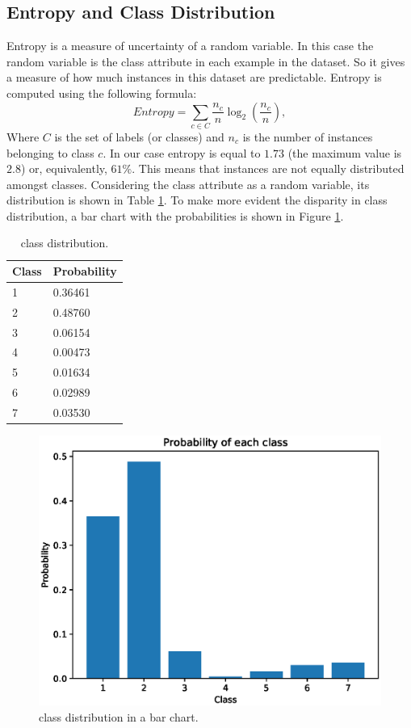 \documentclass[a4paper, 10pt]{article}
\begin{document}
\subsection{Entropy and Class Distribution}
Entropy is a measure of uncertainty of a random variable. In this case the random variable is the class attribute in each example in the dataset. So it gives a measure of how much instances in this dataset are predictable. Entropy is computed using the following formula:
\begin{equation}
	\textit{Entropy} = \sum_{c \in C}\dfrac{n_c}{n}\log_2\left(\dfrac{n_c}{n}\right),
\end{equation}
Where $C$ is the set of labels (or classes) and $n_c$ is the number of instances belonging to class $c$. In our case entropy is equal to $1.73$ (the maximum value is $2.8$) or, equivalently, $61\%$. This means that instances are not equally distributed amongst classes. Considering the class attribute as a random variable, its distribution is shown in Table \ref{tab:class_dist}. To make more evident the disparity in class distribution, a bar chart with the probabilities is shown in Figure \ref{fig:class_dist}.  

\begin{table}[h!]
 \centering
 \begin{tabular}{|l|l|}
 \hline
 \textbf{Class} & \textbf{Probability} \\\hline
 1 & 0.36461\\\hline
2 & 0.48760\\\hline 
3 & 0.06154\\\hline 
4 & 0.00473\\\hline 
5 & 0.01634\\\hline 
6 & 0.02989\\\hline
7 & 0.03530\\\hline
 \end{tabular}
\caption{class distribution.}
\label{tab:class_dist}
\end{table}

\begin{figure}[h!]
 \centering
 \includegraphics[width=0.8\linewidth]{pictures/class_dist.eps}
 \caption{class distribution in a bar chart.}
 \label{fig:class_dist}
\end{figure}
\end{document}
